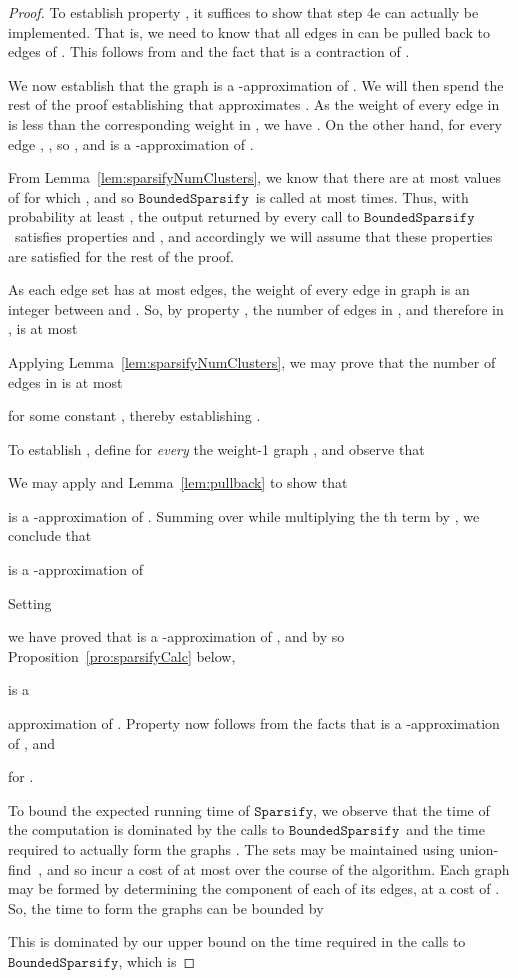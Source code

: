 \documentclass[11pt]{article}
\newcommand{\sparsify}{\ensuremath{\mathtt{Sparsify}}}
\newcommand{\boundedsparsify}{\ensuremath{\mathtt{BoundedSparsify}}}
\begin{document}
\begin{proof}
To establish property , it suffices to show that step 4e can
  actually be implemented.
That is, we need to know that all edges in  can be pulled
  back to edges of .
This follows from  and the fact that  is a contraction
  of .

We now establish that the graph  is a -approximation
  of .
We will then spend the rest of the proof establishing that 
  approximates .
As the weight of every edge in  is less than the corresponding
  weight in , we have .
On the other hand, for every edge , ,
  so , and
   is a -approximation of .

From Lemma~\ref{lem:sparsifyNumClusters}, we know that there are at most
   values of  for which ,
  and so \boundedsparsify \ is called at most  times.
Thus, with probability at least , the output returned by every call
  to \boundedsparsify \ satisfies properties  and , and accordingly
  we will assume that these properties are satisfied for the rest of the proof.

As each edge set  has at most  edges, the weight
  of every edge in graph  is an integer between  and .
So, by property , the number of edges in  , and therefore
  in , is at most

Applying Lemma~\ref{lem:sparsifyNumClusters}, we may prove that the number of edges
  in  is at most

for some constant ,
  thereby establishing .

To establish ,
 define for \textit{every}  the weight-1 graph
  , and observe that

We may apply  and Lemma~\ref{lem:pullback} to show that

is a -approximation of .
Summing over  while multiplying the th term by , we conclude that

is a -approximation of

Setting

we have proved that 
is a -approximation of
,
  and by so
  Proposition~\ref{pro:sparsifyCalc} below,

is a

approximation of .
Property  now follows from the facts that
    is a -approximation of , and

for .

To bound the expected running time of \sparsify,
  we observe that the time of the computation is dominated
  by the calls to \boundedsparsify \ and the time
  required to actually form the graphs .
The sets  may be maintained using
  union-find~\cite{Tarjan}, and so incur a cost of at most 
  over the course of the algorithm.
Each graph  may be formed by determining the component
  of each of its edges, at a cost of .
So, the time to form the graphs  can be bounded by

This is dominated by our upper bound on
  the time required in the calls to \boundedsparsify,
  which is

\end{proof}
\end{document}
